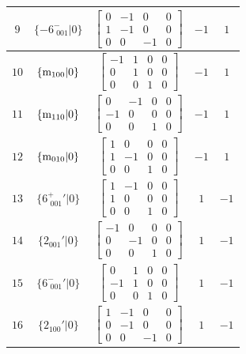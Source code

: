 \documentclass[fleqn,8pt]{jsarticle}
\begin{document}
\begin{longtable}{ccccc}
$ 9 $ & $ \{-6^{-}_{\,\,001}|0\} $ & $ \begin{bmatrix} 0 & -1 & 0 & 0 \\ 1 & -1 & 0 & 0 \\ 0 & 0 & -1 & 0 \end{bmatrix} $ & $ -1 $ & $ 1 $ \\ \hline
$ 10 $ & $ \{{\rm m}_{100}|0\} $ & $ \begin{bmatrix} -1 & 1 & 0 & 0 \\ 0 & 1 & 0 & 0 \\ 0 & 0 & 1 & 0 \end{bmatrix} $ & $ -1 $ & $ 1 $ \\ \hline
$ 11 $ & $ \{{\rm m}_{110}|0\} $ & $ \begin{bmatrix} 0 & -1 & 0 & 0 \\ -1 & 0 & 0 & 0 \\ 0 & 0 & 1 & 0 \end{bmatrix} $ & $ -1 $ & $ 1 $ \\ \hline
$ 12 $ & $ \{{\rm m}_{010}|0\} $ & $ \begin{bmatrix} 1 & 0 & 0 & 0 \\ 1 & -1 & 0 & 0 \\ 0 & 0 & 1 & 0 \end{bmatrix} $ & $ -1 $ & $ 1 $ \\ \hline
$ 13 $ & $ \{6^{+}_{\,\,001}{}'|0\} $ & $ \begin{bmatrix} 1 & -1 & 0 & 0 \\ 1 & 0 & 0 & 0 \\ 0 & 0 & 1 & 0 \end{bmatrix} $ & $ 1 $ & $ -1 $ \\ \hline
$ 14 $ & $ \{2{}_{001}{}'|0\} $ & $ \begin{bmatrix} -1 & 0 & 0 & 0 \\ 0 & -1 & 0 & 0 \\ 0 & 0 & 1 & 0 \end{bmatrix} $ & $ 1 $ & $ -1 $ \\ \hline
$ 15 $ & $ \{6^{-}_{\,\,001}{}'|0\} $ & $ \begin{bmatrix} 0 & 1 & 0 & 0 \\ -1 & 1 & 0 & 0 \\ 0 & 0 & 1 & 0 \end{bmatrix} $ & $ 1 $ & $ -1 $ \\ \hline
$ 16 $ & $ \{2{}_{100}{}'|0\} $ & $ \begin{bmatrix} 1 & -1 & 0 & 0 \\ 0 & -1 & 0 & 0 \\ 0 & 0 & -1 & 0 \end{bmatrix} $ & $ 1 $ & $ -1 $ \\ \hline

\end{longtable}
\end{document}
